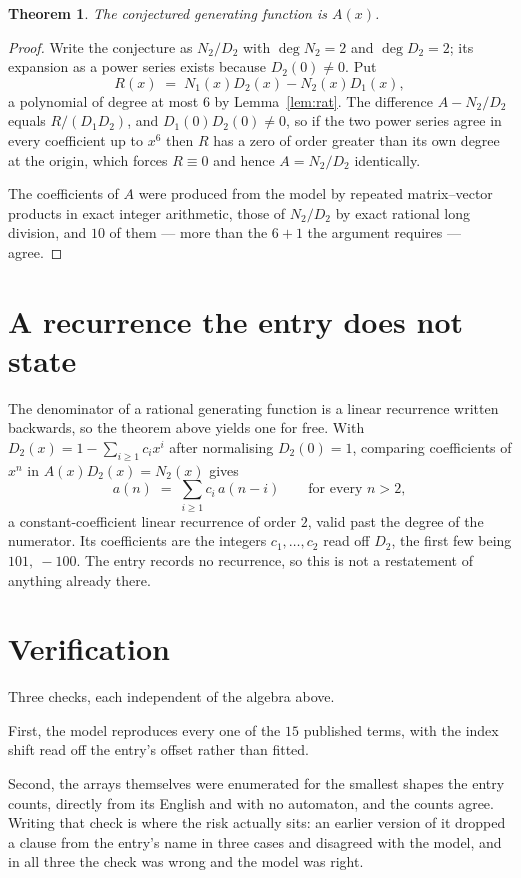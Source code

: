\documentclass[11pt,a4paper]{article}
\theoremstyle{plain}
\newtheorem{theorem}{Theorem}
\theoremstyle{definition}
\begin{document}
\begin{theorem}
The conjectured generating function is $A(x)$.
\end{theorem}

\begin{proof}
Write the conjecture as $N_2/D_2$ with $\deg N_2=2$ and $\deg D_2=2$; its expansion as a
power series exists because $D_2(0)\neq0$. Put
\[
R(x)\;=\;N_1(x)D_2(x)-N_2(x)D_1(x),
\]
a polynomial of degree at most $6$ by Lemma~\ref{lem:rat}. The difference
$A-N_2/D_2$ equals $R/(D_1D_2)$, and $D_1(0)D_2(0)\neq0$, so if the two power series agree in
every coefficient up to $x^{6}$ then $R$ has a zero of order greater than its own
degree at the origin, which forces $R\equiv0$ and hence $A=N_2/D_2$ identically.

The coefficients of $A$ were produced from the model by repeated matrix--vector products in
exact integer arithmetic, those of $N_2/D_2$ by exact rational long division, and $10$
of them --- more than the $6+1$ the argument requires --- agree.
\end{proof}

\section{A recurrence the entry does not state}

The denominator of a rational generating function is a linear recurrence written backwards, so
the theorem above yields one for free. With $D_2(x)=1-\sum_{i\ge1}c_ix^i$ after normalising
$D_2(0)=1$, comparing coefficients of $x^n$ in $A(x)D_2(x)=N_2(x)$ gives
\[
a(n)\;=\;\sum_{i\ge1}c_i\,a(n-i)\qquad\text{for every }n>2,
\]
a constant-coefficient linear recurrence of order $2$, valid past the degree of the
numerator. Its coefficients are the integers $c_1,\dots,c_{2}$ read off $D_2$, the first few being $101,\ -100$. The entry records no recurrence, so this is not a restatement of anything
already there.

\section{Verification}

Three checks, each independent of the algebra above.

First, the model reproduces every one of the $15$ published terms, with the index shift
read off the entry's offset rather than fitted.

Second, the arrays themselves were enumerated for the smallest shapes the entry counts,
directly from its English and with no automaton, and the counts agree. Writing that check is
where the risk actually sits: an earlier version of it dropped a clause from the entry's name
in three cases and disagreed with the model, and in all three the check was wrong and the model
was right.
\end{document}
